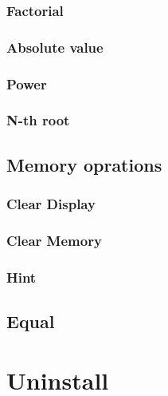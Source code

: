 \documentclass[11pt, a4paper]{article}
\theoremstyle{definition}
\begin{document}
    \subsubsection{Factorial}

    \subsubsection{Absolute value}

    \subsubsection{Power}

    \subsubsection{N-th root}

    \subsection{Memory oprations}

    \subsubsection{Clear Display }

    \subsubsection{Clear Memory}

    \subsubsection{Hint}
    
    \subsection{Equal}

    \section{Uninstall}
\end{document}
